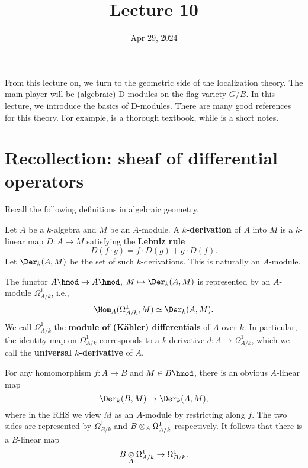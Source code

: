 





\title{Lecture 10}

\date{Apr 29, 2024}

\maketitle

	From this lecture on, we turn to the geometric side of the localization theory. The main player will be (algebraic) D-modules on the flag variety $G/B$. In this lecture, we introduce the basics of D-modules. There are many good references for this theory. For example, \cite{HTT} is a thorough textbook, while \cite{B} is a short notes.

\section{Recollection: sheaf of differential operators}

	Recall the following definitions in algebraic geometry.

	\begin{defn}
		Let $A$ be a $k$-algebra and $M$ be an $A$-module. A \textbf{$k$-derivation} of $A$ into $M$ is a $k$-linear map $D:A\to M$ satisfying the \textbf{Lebniz rule}
		\[
			D(f\cdot g) = f\cdot D (g) + g\cdot D (f).
		\]
		Let $\Der_k(A,M)$ be the set of such $k$-derivations. This is naturally an $A$-module.
	\end{defn}

	\begin{propdefn}
		The functor $A\hmod \to A\hmod$, $M\mapsto \Der_k(A,M)$ is represented by an $A$-module $\Omega^1_{A/k}$, i.e.,
		\[
			\Hom_A( \Omega^1_{A/k}, M ) \simeq \Der_k(A,M).
		\]
		We call $\Omega^1_{A/k}$ the \textbf{module of (Kähler) differentials} of $A$ over $k$. In particular, the identity map on $\Omega^1_{A/k}$ corresponds to a $k$-derivative $d: A\to \Omega^1_{A/k}$, which we call the \textbf{universal $k$-derivative} of $A$.
	\end{propdefn}

	\begin{constr}	
		For any homomorphism $f:A\to B$ and $M\in B\hmod$, there is an obvious $A$-linear map
		\[
			\Der_k(B,M) \to \Der_k(A,M),
		\]
		where in the RHS we view $M$ as an $A$-module by restricting along $f$. The two sides are represented by $\Omega^1_{B/k}$ and $B\ot_A \Omega^1_{A/k}$ respectively. It follows that there is a $B$-linear map
		\[
			B\ot_A \Omega^1_{A/k} \to \Omega^1_{B/k}.
		\]
	\end{constr}

